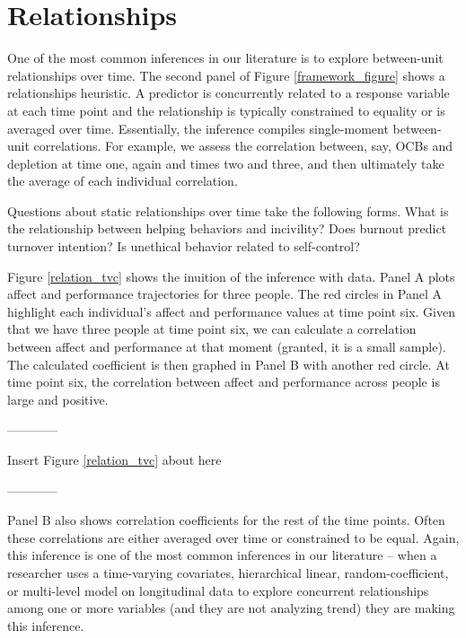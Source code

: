 \documentclass[english,,man]{apa6}
\theoremstyle{definition}
\theoremstyle{definition}
\theoremstyle{definition}
\theoremstyle{remark}
\begin{document}
\hypertarget{relationships}{%
\section{Relationships}\label{relationships}}

One of the most common inferences in our literature is to explore
between-unit relationships over time. The second panel of Figure
\ref{framework_figure} shows a relationships heuristic. A predictor is
concurrently related to a response variable at each time point and the
relationship is typically constrained to equality or is averaged over
time. Essentially, the inference compiles single-moment between-unit
correlations. For example, we assess the correlation between, say, OCBs
and depletion at time one, again and times two and three, and then
ultimately take the average of each individual correlation.

Questions about static relationships over time take the following forms.
What is the relationship between helping behaviors and incivility? Does
burnout predict turnover intention? Is unethical behavior related to
self-control?

Figure \ref{relation_tvc} shows the inuition of the inference with data.
Panel A plots affect and performance trajectories for three people. The
red circles in Panel A highlight each individual's affect and
performance values at time point six. Given that we have three people at
time point six, we can calculate a correlation between affect and
performance at that moment (granted, it is a small sample). The
calculated coefficient is then graphed in Panel B with another red
circle. At time point six, the correlation between affect and
performance across people is large and positive.

\begin{center}

------------

Insert Figure \ref{relation_tvc} about here

------------

\end{center}

Panel B also shows correlation coefficients for the rest of the time
points. Often these correlations are either averaged over time or
constrained to be equal. Again, this inference is one of the most common
inferences in our literature -- when a researcher uses a time-varying
covariates, hierarchical linear, random-coefficient, or multi-level
model on longitudinal data to explore concurrent relationships among one
or more variables (and they are not analyzing trend) they are making
this inference.
\end{document}
